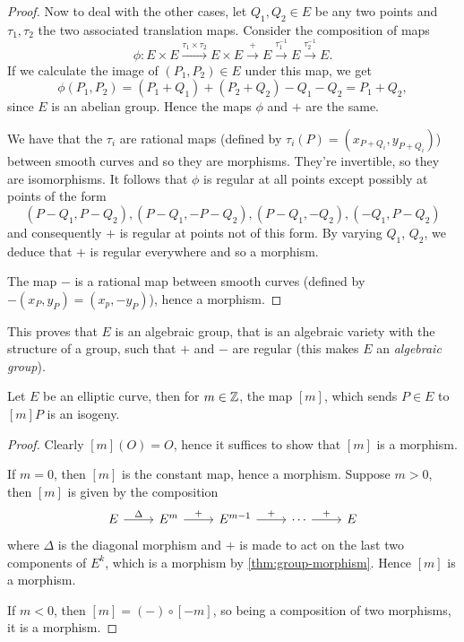 \begin{proof}
	Now to deal with the other cases, let $Q_1, Q_2 \in E$ be any two points
	and $\tau_1, \tau_2$ the two associated translation maps. Consider the
	composition of maps
	\begin{equation*}
		\phi: E\times E \xrightarrow{\tau_1\times\tau_2} E \times E
		\xrightarrow{+}E\xrightarrow{\tau_1^{-1}}E\xrightarrow{\tau_2^{-1}}E.
	\end{equation*}
	If we calculate the image of $(P_1, P_2) \in E$ under this map, we get
	\begin{equation*}
		\phi(P_1, P_2) = (P_1 + Q_1) + (P_2 + Q_2) - Q_1 - Q_2 = P_1 + Q_2,
	\end{equation*}
	since $E$ is an abelian group.
	Hence the maps $\phi$ and $+$ are the same.

	We have that the $\tau_i$ are rational maps 
	(defined by $\tau_i(P) = (x_{P + Q_i}, y_{P + Q_i})$) between smooth curves
	and so they are morphisms. They're invertible, so they are isomorphisms.
	It follows that $\phi$ is regular at all
	points except possibly at points of the form
	\begin{equation*}
		(P - Q_1, P - Q_2), (P-Q_1, -P - Q_2), (P - Q_1, -Q_2), (-Q_1, P-Q_2)
	\end{equation*}
	and consequently $+$ is regular at points not of this form.
	By varying $Q_1$, $Q_2$, we deduce that $+$ is regular everywhere
	and so a morphism.

	The map $-$ is a rational map between smooth curves (defined by
	$-(x_P, y_P) = (x_p, -y_P)$), hence a morphism.
\end{proof}
This proves that $E$ is an algebraic group, that is an algebraic variety
with the structure of a group, such that $+$ and $-$ are regular (this
makes $E$ an \emph{algebraic group}).


\begin{corollary}
	Let $E$ be an elliptic curve, then for $m \in \mathbb{Z}$, the map $[m]$, which
	sends $P \in E$ to $[m]P$ is an isogeny.
\end{corollary}

\begin{proof}
	Clearly $[m](O) = O$, hence it suffices to show that $[m]$ is a morphism.

	If $m = 0$, then $[m]$ is the constant map, hence a morphism.
	Suppose $m > 0$, then $[m]$ is given by the composition
	\begin{equation*}
		\begin{tikzcd}
			E & {E^m} & {E^{m-1}} & \cdots & E
			\arrow["{\Delta}", from=1-1, to=1-2]
			\arrow["{+}", from=1-2, to=1-3]
			\arrow["+", from=1-3, to=1-4]
			\arrow["+", from=1-4, to=1-5]
		\end{tikzcd}
	\end{equation*}
	where $\Delta$ is the diagonal morphism and $+$ is made to act on the
	last two components of $E^k$, which is a morphism by
	\ref{thm:group-morphism}. Hence $[m]$ is a morphism.

	If $m < 0$, then $[m] = (-)\circ[-m]$, so being a composition of two
	morphisms, it is a morphism.
\end{proof}

